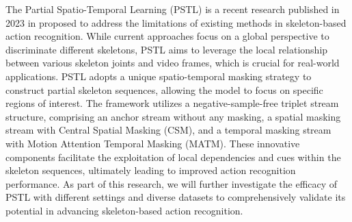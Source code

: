 The Partial Spatio-Temporal Learning (PSTL) is a recent research published in 2023 in \cite{zhou2023self} proposed to address the limitations of existing methods in skeleton-based action recognition. While current approaches focus on a global perspective to discriminate different skeletons, PSTL aims to leverage the local relationship between various skeleton joints and video frames, which is crucial for real-world applications. PSTL adopts a unique spatio-temporal masking strategy to construct partial skeleton sequences, allowing the model to focus on specific regions of interest. The framework utilizes a negative-sample-free triplet stream structure, comprising an anchor stream without any masking, a spatial masking stream with Central Spatial Masking (CSM), and a temporal masking stream with Motion Attention Temporal Masking (MATM). These innovative components facilitate the exploitation of local dependencies and cues within the skeleton sequences, ultimately leading to improved action recognition performance. As part of this research, we will further investigate the efficacy of PSTL with different settings and diverse datasets to comprehensively validate its potential in advancing skeleton-based action recognition.